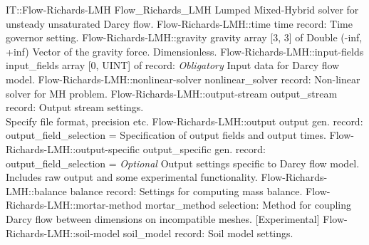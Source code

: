 \begin{RecordType}
	{IT::Flow-Richards-LMH}
	{Flow{\_}Richards{\_}LMH}
	{}%
	{}%
	{{{Lumped Mixed-Hybrid solver for unsteady unsaturated Darcy flow.}%
}}
		\RecKey
			{Flow-Richards-LMH::time}
			{time}
			{{record: }}{}
			{ \ValueDefault{{\{}{\}}}}
			{{{Time governor setting.}%
}}
		\RecKey
			{Flow-Richards-LMH::gravity}
			{gravity}
			{{array [3, 3] of }{Double (-inf, +inf)}}{}
			{ \ValueDefault{[0, 0, -1]}}
			{{{Vector of the gravity force.
Dimensionless.}%
}}
		\RecKey
			{Flow-Richards-LMH::input-fields}
			{input{\_}fields}
			{{array [0, UINT] of }{record: }}{}
			{ \it{Obligatory}}
			{{{Input data for Darcy flow model.}%
}}
		\RecKey
			{Flow-Richards-LMH::nonlinear-solver}
			{nonlinear{\_}solver}
			{{record: }}{}
			{ \ValueDefault{{\{}{\}}}}
			{{{Non-linear solver for MH problem.}%
}}
		\RecKey
			{Flow-Richards-LMH::output-stream}
			{output{\_}stream}
			{{record: }}{}
			{ \ValueDefault{{\{}{\}}}}
			{{{Output stream settings.}\\{
 Specify file format, precision etc.}%
}}
		\RecKey
			{Flow-Richards-LMH::output}
			{output}
			{{gen. record: }}{{output{\_}field{\_}selection}{ = }}
			{ }
			{{{Specification of output fields and output times.}%
}}
		\RecKey
			{Flow-Richards-LMH::output-specific}
			{output{\_}specific}
			{{gen. record: }}{{output{\_}field{\_}selection}{ = }}
			{ \it{Optional}}
			{{{Output settings specific to Darcy flow model.}\\{
Includes raw output and some experimental functionality.}%
}}
		\RecKey
			{Flow-Richards-LMH::balance}
			{balance}
			{{record: }}{}
			{ \ValueDefault{{\{}{\}}}}
			{{{Settings for computing mass balance.}%
}}
		\RecKey
			{Flow-Richards-LMH::mortar-method}
			{mortar{\_}method}
			{{selection: }}{}
			{ }
			{{{Method for coupling Darcy flow between dimensions on incompatible meshes. [Experimental]}%
}}
		\RecKey
			{Flow-Richards-LMH::soil-model}
			{soil{\_}model}
			{{record: }}{}
			{ }
			{{{Soil model settings.}%
}}
\end{RecordType}
